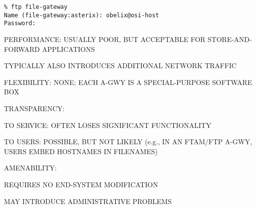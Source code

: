 \begin{bwslide}

\vskip1.5in
\begin{verbatim}
% ftp file-gateway
Name (file-gateway:asterix): obelix@osi-host
Password:
\end{verbatim}
\end{bwslide}






\begin{bwslide}

\begin{nrtc}
\item	PERFORMANCE: USUALLY POOR, BUT ACCEPTABLE FOR STORE-AND-FORWARD
	APPLICATIONS
    \begin{nrtc}
    \item	TYPICALLY ALSO INTRODUCES ADDITIONAL NETWORK TRAFFIC
    \end{nrtc}

\item	FLEXIBILITY: NONE; EACH A-GWY IS A SPECIAL-PURPOSE SOFTWARE BOX

\item	TRANSPARENCY: 
    \begin{nrtc}
    \item	TO SERVICE: OFTEN LOSES SIGNIFICANT FUNCTIONALITY

    \item	TO USERS: POSSIBLE, BUT NOT LIKELY (e.g., IN AN FTAM/FTP A-GWY,
		USERS EMBED HOSTNAMES IN FILENAMES)
    \end{nrtc}

\item	AMENABILITY:
    \begin{nrtc}
    \item	REQUIRES NO END-SYSTEM MODIFICATION

    \item	MAY INTRODUCE ADMINISTRATIVE PROBLEMS
    \end{nrtc}
\end{nrtc}
\end{bwslide}


